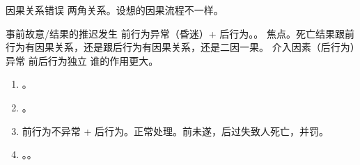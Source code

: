 \begin{enumerate}
\begin{enumerate}
\begin{enumerate}
                        \begin{kk}{因果关系错误}
                          两角关系。设想的因果流程不一样。
                          \begin{kk}{事前故意/结果的推迟发生}
                            前行为异常（昏迷）+ 后行为。。
                            焦点。死亡结果跟前行为有因果关系，还是跟后行为有因果关系，还是二因一果。
                            介入因素（后行为）异常 \yjt 前后行为独立 \yjt 谁的作用更大。
                            \begin{enumerate}
                              \item {}。
                              \item {}。
                              \item 前行为不异常 + 后行为。正常处理。前未遂，后过失致人死亡，并罚。
                              \item {}。。
                            \end{enumerate}
                          \end{kk}


\end{kk}
\end{enumerate}
\end{enumerate}
\end{enumerate}
